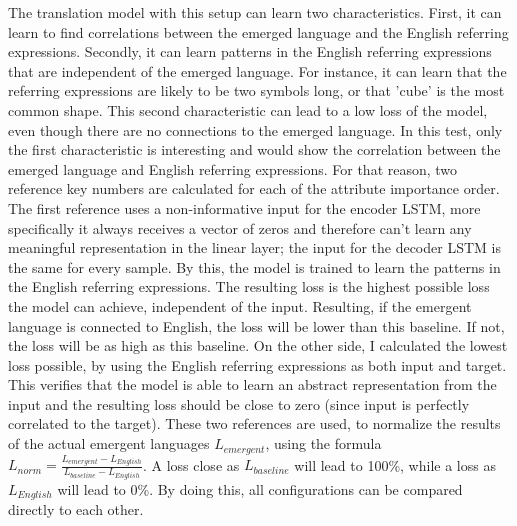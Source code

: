 The translation model with this setup can learn two characteristics.
First, it can learn to find correlations between the emerged language and the English referring expressions.
Secondly, it can learn patterns in the English referring expressions that are independent of the emerged language.
For instance, it can learn that the referring expressions are likely to be two symbols long, or that 'cube' is the most common shape.
This second characteristic can lead to a low loss of the model, even though there are no connections to the emerged language.
In this test, only the first characteristic is interesting and would show the correlation between the emerged language and English referring expressions.
For that reason, two reference key numbers are calculated for each of the attribute importance order.
The first reference uses a non-informative input for the encoder LSTM, more specifically it always receives a vector of zeros and therefore can't learn any meaningful representation in the linear layer; the input for the decoder LSTM is the same for every sample.
By this, the model is trained to learn the patterns in the English referring expressions.
The resulting loss is the highest possible loss the model can achieve, independent of the input.
Resulting, if the emergent language is connected to English, the loss will be lower than this baseline.
If not, the loss will be as high as this baseline.
On the other side, I calculated the lowest loss possible, by using the English referring expressions as both input and target.
This verifies that the model is able to learn an abstract representation from the input and the resulting loss should be close to zero (since input is perfectly correlated to the target).
These two references are used, to normalize the results of the actual emergent languages $L_{emergent}$, using the formula $L_{norm} = \frac{L_{emergent}-L_{English}}{L_{baseline} - L_{English}}$.
A loss close as $L_{baseline}$ will lead to 100\%, while a loss as $L_{English}$ will lead to 0\%.
By doing this, all configurations can be compared directly to each other.

